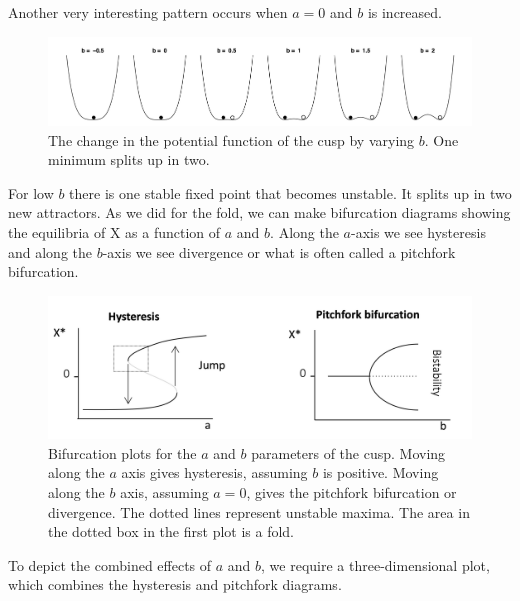 \documentclass[
  a4paper,
  DIV=11,
  numbers=noendperiod]{scrreprt}
\begin{document}
Another very interesting pattern occurs when \(a = 0\) and \(b\) is
increased.

\begin{figure}

{\centering \includegraphics{media/ch3/image8.jpg}

}

\caption{\label{fig-ch3-img8-old-20}The change in the potential function
of the cusp by varying \(b\). One minimum splits up in two.}

\end{figure}

For low \(b\) there is one stable fixed point that becomes unstable. It
splits up in two new attractors. As we did for the fold, we can make
bifurcation diagrams showing the equilibria of X as a function of \(a\)
and \(b\). Along the \(a\)-axis we see hysteresis and along the
\(b\)-axis we see divergence or what is often called a pitchfork
bifurcation.

\begin{figure}

{\centering \includegraphics{media/ch3/image9.jpg}

}

\caption{\label{fig-ch3-img9-old-21}Bifurcation plots for the \(a\) and
\(b\) parameters of the cusp. Moving along the \(a\) axis gives
hysteresis, assuming \(b\) is positive. Moving along the \(b\) axis,
assuming \(a=0\), gives the pitchfork bifurcation or divergence. The
dotted lines represent unstable maxima. The area in the dotted box in
the first plot is a fold.}

\end{figure}

To depict the combined effects of \(a\) and \(b\), we require a
three-dimensional plot, which combines the hysteresis and pitchfork
diagrams.
\end{document}
